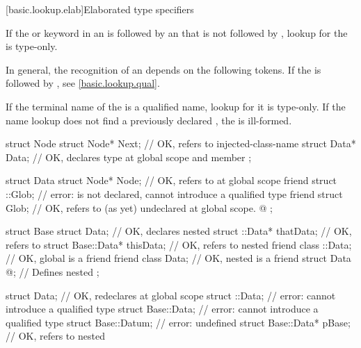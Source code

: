 %

[basic.lookup.elab]{Elaborated type specifiers}%
%

\pnum
If the  or  keyword
in an 
is followed by an 
that is not followed by \tcode{::},
lookup for the  is type-only.
\begin{note}
In general, the recognition of an 
depends on the following tokens.
If the  is followed by \tcode{::},
see \ref{basic.lookup.qual}.
\end{note}

\pnum
If the terminal name of the 
is a qualified name,
lookup for it is type-only.
If the name lookup does not find a previously declared ,
the  is ill-formed.

\pnum
\begin{example}
\begin{codeblock}
struct Node {
  struct Node* Next;            // OK, refers to injected-class-name 
  struct Data* Data;            // OK, declares type  at global scope and member 
};

struct Data {
  struct Node* Node;            // OK, refers to  at global scope
  friend struct ::Glob;         // error:  is not declared, cannot introduce a qualified type
  friend struct Glob;           // OK, refers to (as yet) undeclared  at global scope.
  @\commentellip@
};

struct Base {
  struct Data;                  // OK, declares nested 
  struct ::Data*     thatData;  // OK, refers to 
  struct Base::Data* thisData;  // OK, refers to nested 
  friend class ::Data;          // OK, global  is a friend
  friend class Data;            // OK, nested  is a friend
  struct Data { @\commentellip@ };    // Defines nested 
};

struct Data;                    // OK, redeclares  at global scope
struct ::Data;                  // error: cannot introduce a qualified type
struct Base::Data;              // error: cannot introduce a qualified type
struct Base::Datum;             // error:  undefined
struct Base::Data* pBase;       // OK, refers to nested 
\end{codeblock}
\end{example}
%

